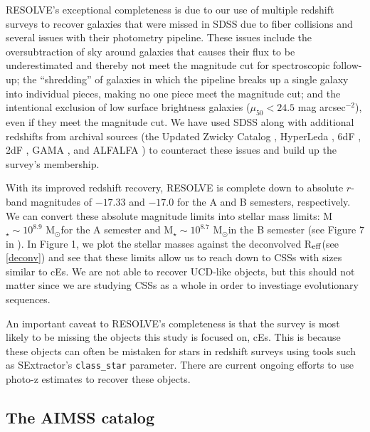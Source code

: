 \documentclass[iop,apj,twocolappendix]{emulateapj}
\newcommand{\Reff}{R$_{\rm eff}$}
\newcommand{\Msun}{M$_{\odot}$}
\begin{document}
RESOLVE's exceptional completeness is due to our use of multiple redshift surveys to recover galaxies that were missed in SDSS due to fiber collisions and several issues with their photometry pipeline. These issues include the oversubtraction of sky around galaxies that causes their flux to be underestimated and thereby not meet the magnitude cut for spectroscopic follow-up; the ``shredding'' of galaxies in which the pipeline breaks up a single galaxy into individual pieces, making no one piece meet the magnitude cut; and the intentional exclusion of low surface brightness galaxies ($\mu_{50} < 24.5$ mag arcsec$^{-2}$), even if they meet the magnitude cut. We have used SDSS along with additional redshifts from archival sources (the Updated Zwicky Catalog \cite{Falco1999}, HyperLeda \cite{Paturel2003}, 6dF \cite{Jones2009}, 2dF \cite{Colless2001}, GAMA \cite{Driver2011}, and ALFALFA \cite{Haynes2011}) to counteract these issues and build up the survey's membership.

With its improved redshift recovery, RESOLVE is complete down to absolute $r$-band magnitudes of $-17.33$ and $-17.0$ for the A and B semesters, respectively. We can convert these absolute magnitude limits into stellar mass limits: M$_{\star} \sim 10^{8.9}$ \Msun for the A semester and M$_{\star} \sim 10^{8.7}$ \Msun in the B semester (see Figure 7 in \cite{Eckert2015B}). In Figure 1, we plot the stellar masses against the deconvolved \Reff (see \autoref{deconv}) and see that these limits allow us to reach down to CSSs with sizes similar to cEs. We are not able to recover UCD-like objects, but this should not matter since we are studying CSSs as a whole in order to investiage evolutionary sequences.

An important caveat to RESOLVE's completeness is that the survey is most likely to be missing the objects this study is focused on, cEs. This is because these objects can often be mistaken for stars in redshift surveys using tools such as SExtractor's \texttt{class\_star} parameter. There are current ongoing efforts to use photo-z estimates to recover these objects.

\subsection{The AIMSS catalog}
\label{aimss}
\end{document}
